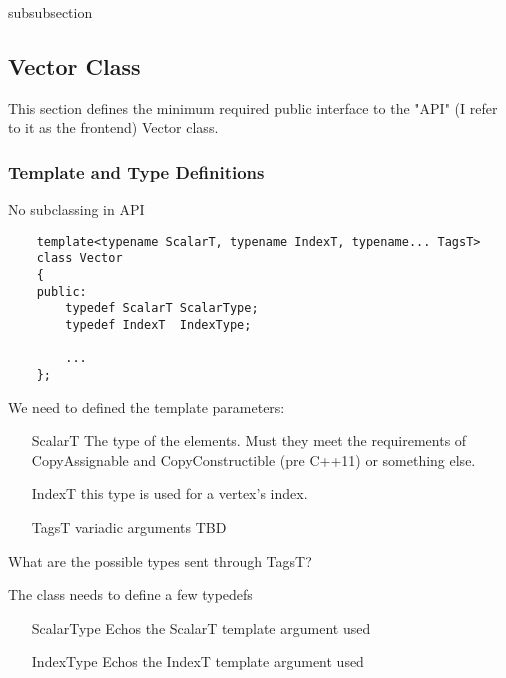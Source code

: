 subsubsection{


\subsection{Vector Class}

This section defines the minimum required public interface to the "API" (I refer to it
as the frontend) Vector class.  

\subsubsection{Template and Type Definitions}

No subclassing in API

\begin{verbatim}
    template<typename ScalarT, typename IndexT, typename... TagsT>
    class Vector
    {
    public:
        typedef ScalarT ScalarType;
        typedef IndexT  IndexType;

        ...
    };
\end{verbatim}

We need to defined the template parameters:
\begin{itemize}[leftmargin=1.1in]
\item[\sf ScalarT]  The type of the elements.  Must they meet the requirements of CopyAssignable and CopyConstructible (pre C++11) or something else.  
\item[\sf IndexT] this type is used for a vertex’s index. 
\item[\sf TagsT] variadic arguments TBD
\end{itemize}

What are the possible types sent through TagsT?

The class needs to define a few typedefs
\begin{itemize}[leftmargin=1.1in]
\item[\sf ScalarType] Echos the ScalarT template argument used
\item[\sf IndexType]  Echos the IndexT template argument used
\end{itemize}

}
